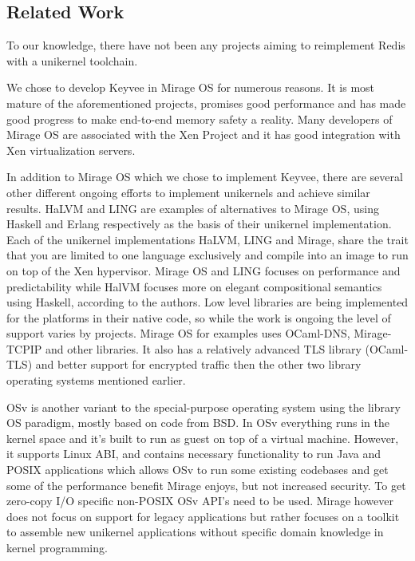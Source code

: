 \documentclass[english,10pt,twocolumn]{article}
\begin{document}
\subsection{Related Work}

To our knowledge, there have not been any projects aiming to reimplement Redis with a unikernel toolchain.

We chose to develop Keyvee in Mirage OS for numerous reasons.
It is most mature of the aforementioned projects, promises good performance and has made good progress to make end-to-end memory safety a reality.
Many developers of Mirage OS are associated with the Xen Project and it has good integration with Xen virtualization servers.

In addition to Mirage OS which we chose to implement Keyvee, there are several other different ongoing efforts to implement unikernels and achieve similar results.
HaLVM\cite{halvm} and LING\cite{ling} are examples of alternatives to Mirage OS, using Haskell and Erlang respectively as the basis of their unikernel implementation.
Each of the unikernel implementations HaLVM, LING and Mirage, share the trait that you are limited to one language exclusively and compile into an image to run on top of the Xen hypervisor.
Mirage OS and LING focuses on performance and predictability while HalVM focuses more on elegant compositional semantics using Haskell, according to the authors\cite{tripreport}.
Low level libraries are being implemented for the platforms in their native code, so while the work is ongoing the level of support varies by projects.
Mirage OS for examples uses OCaml-DNS, Mirage-TCPIP and other libraries. It also has a relatively advanced TLS library (OCaml-TLS) and better support for encrypted traffic then the other two library operating systems mentioned earlier.

OSv\cite{osv} is another variant to the special-purpose operating system using the library OS paradigm, mostly based on code from BSD.
In OSv everything runs in the kernel space and it's built to run as guest on top of a virtual machine.
However, it supports Linux ABI, and contains necessary functionality to run Java and POSIX applications which allows OSv to run some existing codebases and get some of the performance benefit Mirage enjoys, but not increased security.
To get zero-copy I/O specific non-POSIX OSv API's need to be used.
Mirage however does not focus on support for legacy applications but rather focuses on a toolkit to assemble new unikernel applications without specific domain knowledge in kernel programming.
\end{document}
